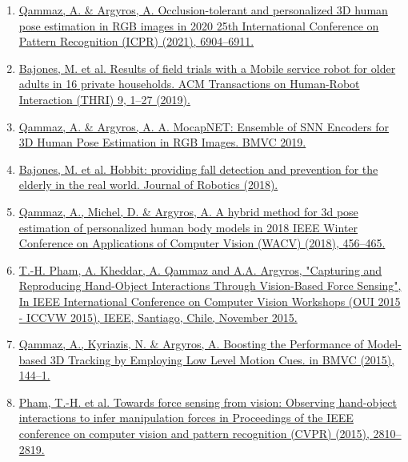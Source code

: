 \documentclass[a4,8pt]{article}
\begin{document}
\begin{enumerate}[itemsep=-1mm]
  \item \href{http://users.ics.forth.gr/~argyros/mypapers/2021_01_ICPR_Qammaz.pdf}{Qammaz, A. \& Argyros, A. Occlusion-tolerant and personalized 3D human pose estimation in RGB images in 2020 25th International Conference on Pattern Recognition (ICPR) (2021), 6904–6911.}
  
  \item \href{http://users.ics.forth.gr/~argyros/mypapers/2019_journal_12_HRI_bajones.pdf}{Bajones, M. et al. Results of field trials with a Mobile service robot for older adults in 16 private households. ACM Transactions on Human-Robot Interaction (THRI) 9, 1–27 (2019).}
  
  \item \href{http://users.ics.forth.gr/~argyros/mypapers/2019_09_BMVC_mocapnet.pdf}{Qammaz, A. \& Argyros, A. A. MocapNET: Ensemble of SNN Encoders for 3D Human Pose Estimation in RGB Images. BMVC 2019.}

  \item \href{http://users.ics.forth.gr/~argyros/mypapers/2018_journal_JoR_HOBBIT.pdf}{Bajones, M. et al. Hobbit: providing fall detection and prevention for the elderly in the real world. Journal of Robotics (2018).}
  
  \item \href{http://users.ics.forth.gr/~argyros/mypapers/2018_03_WACV_personalizedHumanPose.pdf}{Qammaz, A., Michel, D. \& Argyros, A. A hybrid method for 3d pose estimation of personalized human body models in 2018 IEEE Winter Conference on Applications of Computer Vision (WACV) (2018), 456–465.}

  \item \href{http://users.ics.forth.gr/~argyros/mypapers/2015_12_OUI_FSV.pdf}{T.-H. Pham, A. Kheddar, A. Qammaz and A.A. Argyros, "Capturing and Reproducing Hand-Object Interactions Through Vision-Based Force Sensing", In IEEE International Conference on Computer Vision Workshops (OUI 2015 - ICCVW 2015), IEEE, Santiago, Chile, November 2015. }
  
  \item \href{http://users.ics.forth.gr/~argyros/mypapers/2015_09_BMVC_fect.pdf}{Qammaz, A., Kyriazis, N. \& Argyros, A. Boosting the Performance of Model-based 3D Tracking by Employing Low Level Motion Cues. in BMVC (2015), 144–1.}
  
  \item \href{http://users.ics.forth.gr/~argyros/mypapers/2015_06_CVPR_fsv.pdf}{Pham, T.-H. et al. Towards force sensing from vision: Observing hand-object interactions to infer manipulation forces in Proceedings of the IEEE conference on computer vision and pattern recognition (CVPR) (2015), 2810–2819.}
\end{enumerate}
\vspace{-0.4cm}






\end{document}

